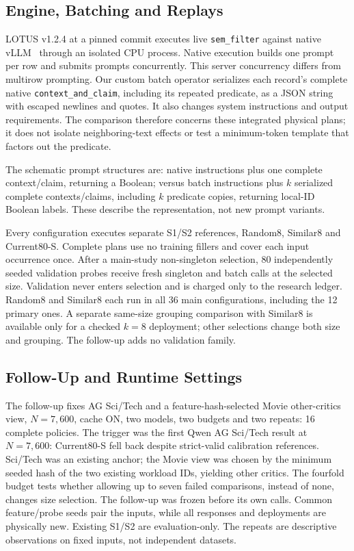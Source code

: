 \subsection{Engine, Batching and Replays}
LOTUS v1.2.4 at a pinned commit executes live \texttt{sem\_filter} against native vLLM~\cite{vllm} through an isolated CPU process. Native execution builds one prompt per row and submits prompts concurrently. This server concurrency differs from multirow prompting. Our custom batch operator serializes each record's complete native \texttt{context\_and\_claim}, including its repeated predicate, as a JSON string with escaped newlines and quotes. It also changes system instructions and output requirements. The comparison therefore concerns these integrated physical plans; it does not isolate neighboring-text effects or test a minimum-token template that factors out the predicate.

The schematic prompt structures are: native instructions plus one complete context/claim, returning a Boolean; versus batch instructions plus $k$ serialized complete contexts/claims, including $k$ predicate copies, returning local-ID Boolean labels. These describe the representation, not new prompt variants.

Every configuration executes separate S1/S2 references, Random8, Similar8 and Current80-S. Complete plans use no training fillers and cover each input occurrence once. After a main-study non-singleton selection, 80 independently seeded validation probes receive fresh singleton and batch calls at the selected size. Validation never enters selection and is charged only to the research ledger. Random8 and Similar8 each run in all 36 main configurations, including the 12 primary ones. A separate same-size grouping comparison with Similar8 is available only for a checked $k=8$ deployment; other selections change both size and grouping. The follow-up adds no validation family.

\subsection{Follow-Up and Runtime Settings}
The follow-up fixes AG Sci/Tech and a feature-hash-selected Movie other-critics view, $N=7,600$, cache ON, two models, two budgets and two repeats: 16 complete policies. The trigger was the first Qwen AG Sci/Tech result at $N=7,600$: Current80-S fell back despite strict-valid calibration references. Sci/Tech was an existing anchor; the Movie view was chosen by the minimum seeded hash of the two existing workload IDs, yielding other critics. The fourfold budget tests whether allowing up to seven failed comparisons, instead of none, changes size selection. The follow-up was frozen before its own calls. Common feature/probe seeds pair the inputs, while all responses and deployments are physically new. Existing S1/S2 are evaluation-only. The repeats are descriptive observations on fixed inputs, not independent datasets.

